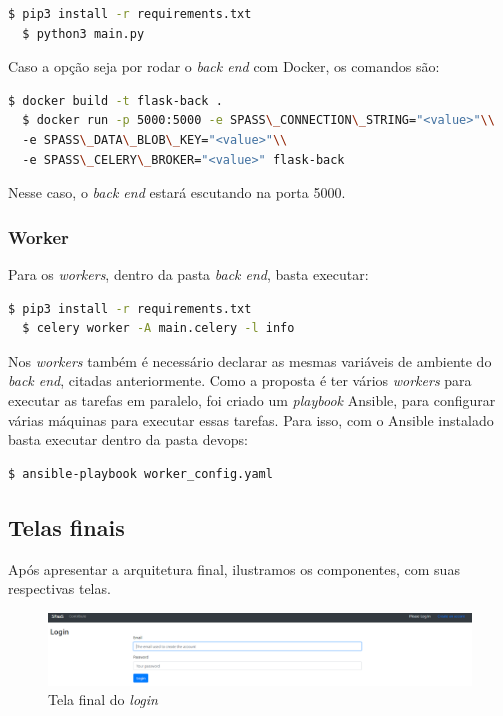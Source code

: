 \documentclass[11pt,twoside]{article}
\begin{document}
\begin{lstlisting}[language=bash]
  $ pip3 install -r requirements.txt
  $ python3 main.py
\end{lstlisting}

Caso a opção seja por rodar o \emph{back end} com Docker, os comandos são:

\begin{lstlisting}[language=bash]
  $ docker build -t flask-back .
  $ docker run -p 5000:5000 -e SPASS\_CONNECTION\_STRING="<value>"\\ 
  -e SPASS\_DATA\_BLOB\_KEY="<value>"\\
  -e SPASS\_CELERY\_BROKER="<value>" flask-back
\end{lstlisting}

Nesse caso, o \emph{back end} estará escutando na porta 5000.

\subsubsection{Worker}

Para os \emph{workers}, dentro da pasta \emph{back end}, basta executar:

\begin{lstlisting}[language=bash]
  $ pip3 install -r requirements.txt
  $ celery worker -A main.celery -l info
\end{lstlisting}

Nos \emph{workers} também é necessário declarar as mesmas variáveis de ambiente do \emph{back end}, citadas anteriormente. 
Como a proposta é ter vários \emph{workers} para executar as tarefas em paralelo, foi criado um \emph{playbook} Ansible, para configurar várias máquinas para 
executar essas tarefas. Para isso, com o Ansible instalado basta executar dentro da pasta devops:

\begin{lstlisting}[language=bash]
  $ ansible-playbook worker_config.yaml
\end{lstlisting}

\subsection{Telas finais}

Após apresentar a arquitetura final, ilustramos os componentes, com suas respectivas telas. 

\begin{figure}[!h]
  \centering
  \includegraphics[scale=0.3]{final_login.eps}
  \caption{Tela final do \emph{login}}
  \label{fig:finalLogin}
\end{figure}
\end{document}
